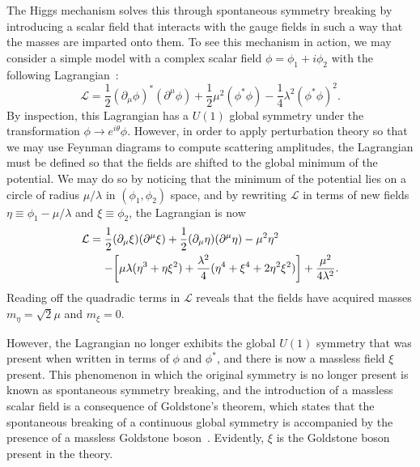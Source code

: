 The Higgs mechanism solves this through spontaneous symmetry breaking by introducing a scalar field that interacts with the gauge fields in such a way that the masses are imparted onto them.
To see this mechanism in action, we may consider a simple model with a complex scalar field $\phi=\phi_1+i\phi_2$ with the following Lagrangian~\cite{GriffithsParticle}:
\begin{equation}
  \mathcal{L}=\frac{1}{2}(\partial_\mu\phi)^*(\partial^\mu\phi)+\frac{1}{2}\mu^2(\phi^*\phi)-\frac{1}{4}\lambda^2(\phi^*\phi)^2.
\end{equation}
By inspection, this Lagrangian has a $U(1)$ global symmetry under the transformation $\phi\to e^{i\theta}\phi$.
However, in order to apply perturbation theory so that we may use Feynman diagrams to compute scattering amplitudes, the Lagrangian must be defined so that the fields are shifted to the global minimum of the potential.
We may do so by noticing that the minimum of the potential lies on a circle of radius $\mu/\lambda$ in $(\phi_1,\phi_2)$ space, and by rewriting $\mathcal{L}$ in terms of new fields $\eta\equiv\phi_1-\mu/\lambda$ and $\xi\equiv\phi_2$, the Lagrangian is now
\begin{equation}
  \begin{aligned}
    \mathcal{L} &= \frac{1}{2}(\partial_\mu\xi)(\partial^\mu\xi)+\frac{1}{2}(\partial_\mu\eta)(\partial^\mu\eta)-\mu^2\eta^2\\
    &\equad- \bqty{\mu\lambda(\eta^3+\eta\xi^2)+\frac{\lambda^2}{4}(\eta^4+\xi^4+2\eta^2\xi^2)}+\frac{\mu^2}{4\lambda^2}.
  \end{aligned}
\end{equation}
Reading off the quadradic terms in $\mathcal{L}$ reveals that the fields have acquired masses $m_\eta=\sqrt{2}\mu$ and $m_\xi=0$.

However, the Lagrangian no longer exhibits the global $U(1)$ symmetry that was present when written in terms of $\phi$ and $\phi^*$, and there is now a massless field $\xi$ present.
This phenomenon in which the original symmetry is no longer present is known as spontaneous symmetry breaking, and the introduction of a massless scalar field is a consequence of Goldstone's theorem, which states that the spontaneous breaking of a continuous global symmetry is accompanied by the presence of a massless Goldstone boson~\cite{PhysRev.127.965}.
Evidently, $\xi$ is the Goldstone boson present in the theory.

